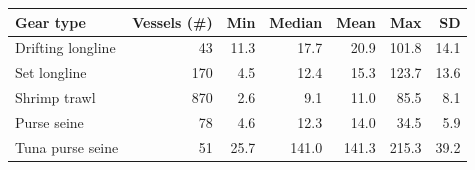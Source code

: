 
\begin{tabular}{lrrrrrr}
\toprule
Gear type & Vessels (\#) & Min & Median & Mean & Max & SD\\
\midrule
Drifting longline & 43 & 11.3 & 17.7 & 20.9 & 101.8 & 14.1\\
Set longline & 170 & 4.5 & 12.4 & 15.3 & 123.7 & 13.6\\
Shrimp trawl & 870 & 2.6 & 9.1 & 11.0 & 85.5 & 8.1\\
Purse seine & 78 & 4.6 & 12.3 & 14.0 & 34.5 & 5.9\\
Tuna purse seine & 51 & 25.7 & 141.0 & 141.3 & 215.3 & 39.2\\
\bottomrule
\end{tabular}
